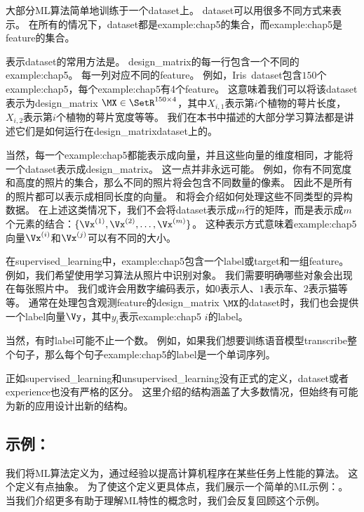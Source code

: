 大部分\gls{ML}算法简单地训练于一个\gls{dataset}上。
\gls{dataset}可以用很多不同方式来表示。
在所有的情况下，\gls{dataset}都是\gls{example:chap5}的集合，而\gls{example:chap5}是\gls{feature}的集合。

表示\gls{dataset}的常用方法是。
\gls{design_matrix}的每一行包含一个不同的\gls{example:chap5}。
每一列对应不同的\gls{feature}。
例如，Iris~\gls{dataset}包含$150$个\gls{example:chap5}，每个\gls{example:chap5}有4个\gls{feature}。
这意味着我们可以将该\gls{dataset}表示为\gls{design_matrix} $\MX\in\SetR^{150\times 4}$，其中$X_{i,1}$表示第$i$个植物的萼片长度，$X_{i,2}$表示第$i$个植物的萼片宽度等等。
我们在本书中描述的大部分学习算法都是讲述它们是如何运行在\gls{design_matrix}\gls{dataset}上的。

当然，每一个\gls{example:chap5}都能表示成向量，并且这些向量的维度相同，才能将一个\gls{dataset}表示成\gls{design_matrix}。
这一点并非永远可能。
例如，你有不同宽度和高度的照片的集合，那么不同的照片将会包含不同数量的像素。
因此不是所有的照片都可以表示成相同长度的向量。
和将会介绍如何处理这些不同类型的异构数据。
在上述这类情况下，我们不会将\gls{dataset}表示成$m$行的矩阵，而是表示成$m$个元素的结合：$\{\Vx^{(1)},\Vx^{(2)},\dots,\Vx^{(m)}\}$。
这种表示方式意味着\gls{example:chap5}向量$\Vx^{(i)}$和$\Vx^{(j)}$可以有不同的大小。


在\gls{supervised_learning}中，\gls{example:chap5}包含一个\gls{label}或\gls{target}和一组\gls{feature}。
例如，我们希望使用学习算法从照片中识别对象。
我们需要明确哪些对象会出现在每张照片中。
我们或许会用数字编码表示，如$0$表示人、$1$表示车、$2$表示猫等等。
通常在处理包含观测\gls{feature}的\gls{design_matrix} $\MX$的\gls{dataset}时，我们也会提供一个\gls{label}向量$\Vy$，其中$y_i$表示\gls{example:chap5} $i$的\gls{label}。


当然，有时\gls{label}可能不止一个数。
例如，如果我们想要训练语音模型\gls{transcribe}整个句子，那么每个句子\gls{example:chap5}的\gls{label}是一个单词序列。


正如\gls{supervised_learning}和\gls{unsupervised_learning}没有正式的定义，\gls{dataset}或者\gls{experience}也没有严格的区分。
这里介绍的结构涵盖了大多数情况，但始终有可能为新的应用设计出新的结构。

\subsection{示例：}
\label{sec:example_linear_regression}
我们将\gls{ML}算法定义为，通过经验以提高计算机程序在某些任务上性能的算法。
这个定义有点抽象。
为了使这个定义更具体点，我们展示一个简单的\gls{ML}示例：。
当我们介绍更多有助于理解\gls{ML}特性的概念时，我们会反复回顾这个示例。

